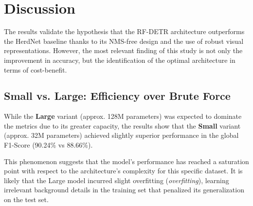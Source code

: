 \section{Discussion}

The results validate the hypothesis that the RF-DETR architecture outperforms the HerdNet baseline thanks to its NMS-free design and the use of robust visual representations. However, the most relevant finding of this study is not only the improvement in accuracy, but the identification of the optimal architecture in terms of cost-benefit.

\subsection{Small vs. Large: Efficiency over Brute Force}

While the \textbf{Large} variant (approx. 128M parameters) was expected to dominate the metrics due to its greater capacity, the results show that the \textbf{Small} variant (approx. 32M parameters) achieved slightly superior performance in the global F1-Score (90.24\% vs 88.66\%).

This phenomenon suggests that the model's performance has reached a saturation point with respect to the architecture's complexity for this specific dataset. It is likely that the Large model incurred slight overfitting (\textit{overfitting}), learning irrelevant background details in the training set that penalized its generalization on the test set.

